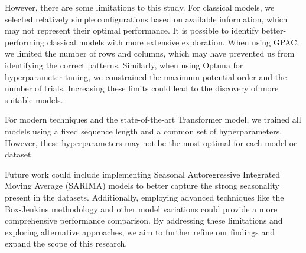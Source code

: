 \documentclass{scrartcl}
\begin{document}
However, there are some limitations to this study. For classical models, we selected relatively simple configurations based on available information, which may not represent their optimal performance. It is possible to identify better-performing classical models with more extensive exploration. When using GPAC, we limited the number of rows and columns, which may have prevented us from identifying the correct patterns. Similarly, when using Optuna for hyperparameter tuning, we constrained the maximum potential order and the number of trials. Increasing these limits could lead to the discovery of more suitable models.

For modern techniques and the state-of-the-art Transformer model, we trained all models using a fixed sequence length and a common set of hyperparameters. However, these hyperparameters may not be the most optimal for each model or dataset.

Future work could include implementing Seasonal Autoregressive Integrated Moving Average (SARIMA) \cite{box2015time} models to better capture the strong seasonality present in the datasets. Additionally, employing advanced techniques like the Box-Jenkins \cite{box2015time} methodology and other model variations could provide a more comprehensive performance comparison. By addressing these limitations and exploring alternative approaches, we aim to further refine our findings and expand the scope of this research.






\end{document}
